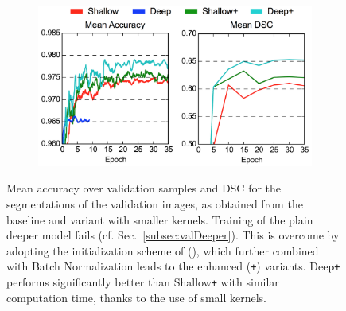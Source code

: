 \begin{figure}[!h]
\centering
\begin{subfigure}[b]{0.5\textwidth}
\centering
	\includegraphics[clip=true, trim=0pt 0pt 0pt 0pt, width=1.0\textwidth]{figures/validationOfArchitecture/deepProblems/deepFigureToPut.png}
\end{subfigure}
\caption{Mean accuracy over validation samples and DSC for the segmentations of the validation images, as obtained from the  baseline and  variant with smaller kernels. Training of the plain deeper model fails (cf. Sec.~\ref{subsec:valDeeper}). This is overcome by adopting the initialization scheme of (\cite{he2015delving}), which further combined with Batch Normalization leads to the enhanced (\texttt{+}) variants. Deep\texttt{+} performs significantly better than Shallow\texttt{+} with similar computation time, thanks to the use of small kernels.
}
\label{fig:deepProblems}
\end{figure}
